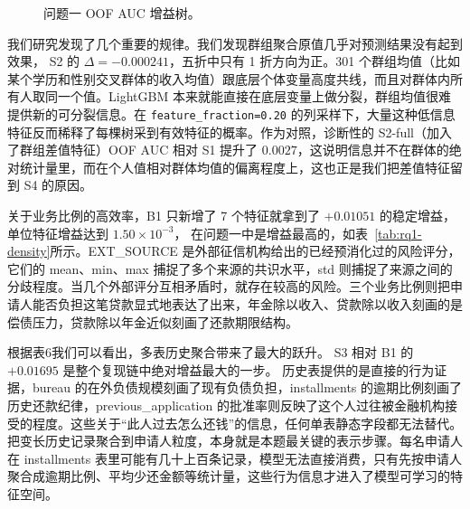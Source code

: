 \documentclass[12pt,UTF8,fontset=windows]{ctexart}
\begin{document}
\begin{figure}[h]
\centering
{}
\caption{问题一 OOF AUC 增益树。}\label{fig:gain-tree}
\end{figure}

我们研究发现了几个重要的规律。我们发现群组聚合原值几乎对预测结果没有起到效果， S2 的 $\Delta=-0.000241$，五折中只有 1 折方向为正。301 个群组均值（比如某个学历和性别交叉群体的收入均值）跟底层个体变量高度共线，而且对群体内所有人取同一个值。LightGBM 本来就能直接在底层变量上做分裂，群组均值很难提供新的可分裂信息。在 \texttt{feature\_fraction=0.20} 的列采样下，大量这种低信息特征反而稀释了每棵树采到有效特征的概率。作为对照，诊断性的 S2-full（加入了群组差值特征）OOF AUC 相对 S1 提升了 $0.0027$，这说明信息并不在群体的绝对统计量里，而在个人值相对群体均值的偏离程度上，这也正是我们把差值特征留到 S4 的原因。

关于业务比例的高效率，B1 只新增了 7 个特征就拿到了 $+0.01051$ 的稳定增益，单位特征增益达到 $1.50\times10^{-3}$，
在问题一中是增益最高的，如表~\ref{tab:rq1-density}所示。EXT\_SOURCE 是外部征信机构给出的已经预消化过的风险评分，
它们的 mean、min、max 捕捉了多个来源的共识水平，std 则捕捉了来源之间的分歧程度。当几个外部评分互相矛盾时，就存在较高的风险。三个业务比例则把申请人能否负担这笔贷款显式地表达了出来，年金除以收入、贷款除以收入刻画的是偿债压力，贷款除以年金近似刻画了还款期限结构。

根据表6我们可以看出，多表历史聚合带来了最大的跃升。 S3 相对 B1 的 $+0.01695$ 是整个复现链中绝对增益最大的一步。
历史表提供的是直接的行为证据，bureau 的在外负债规模刻画了现有负债负担，installments 的逾期比例刻画了历史还款纪律，previous\_application 的批准率则反映了这个人过往被金融机构接受的程度。这些关于“此人过去怎么还钱”的信息，任何单表静态字段都无法替代。把变长历史记录聚合到申请人粒度，本身就是本题最关键的表示步骤。每名申请人在 installments 表里可能有几十上百条记录，模型无法直接消费，只有先按申请人聚合成逾期比例、平均少还金额等统计量，这些行为信息才进入了模型可学习的特征空间。
\end{document}
